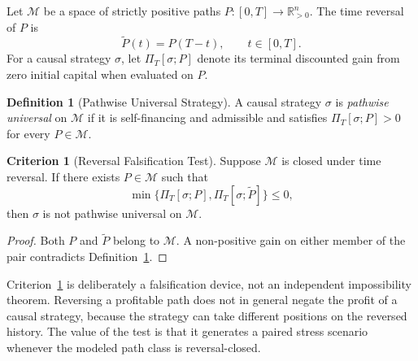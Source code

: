 \documentclass[aps,pra,reprint,superscriptaddress,amsmath,amssymb,floatfix]{revtex4-2}
\theoremstyle{plain}
\theoremstyle{definition}
\newtheorem{definition}{Definition}
\newtheorem{criterion}{Criterion}
\theoremstyle{remark}
\begin{document}
Let \(\mathcal{M}\) be a space of strictly positive paths
\(P\colon[0,T]\to\mathbb{R}_{>0}^n\). The time reversal of \(P\) is
\begin{equation}
  \widetilde{P}(t)=P(T-t), \qquad t\in[0,T].
  \label{eq:timereversal}
\end{equation}
For a causal strategy \(\sigma\), let \(\Pi_T[\sigma;P]\) denote its terminal
discounted gain from zero initial capital when evaluated on \(P\).

\begin{definition}[Pathwise Universal Strategy]
\label{def:universal}
  A causal strategy \(\sigma\) is \emph{pathwise universal} on
  \(\mathcal{M}\) if it is self-financing and admissible and satisfies
  \(\Pi_T[\sigma;P]>0\) for every \(P\in\mathcal{M}\).
\end{definition}

\begin{criterion}[Reversal Falsification Test]
  \label{crit:tr}
  Suppose \(\mathcal{M}\) is closed under time reversal. If there exists
  \(P\in\mathcal{M}\) such that
  \begin{equation}
    \min\{\Pi_T[\sigma;P],\Pi_T[\sigma;\widetilde P]\}\leq 0,
    \label{eq:reversaltest}
  \end{equation}
  then \(\sigma\) is not pathwise universal on \(\mathcal{M}\).
\end{criterion}

\begin{proof}
Both \(P\) and \(\widetilde P\) belong to \(\mathcal{M}\). A non-positive gain
on either member of the pair contradicts Definition~\ref{def:universal}.
\end{proof}

Criterion~\ref{crit:tr} is deliberately a falsification device, not an
independent impossibility theorem. Reversing a profitable path does not in
general negate the profit of a causal strategy, because the strategy can take
different positions on the reversed history. The value of the test is that it
generates a paired stress scenario whenever the modeled path class is
reversal-closed.
\end{document}
